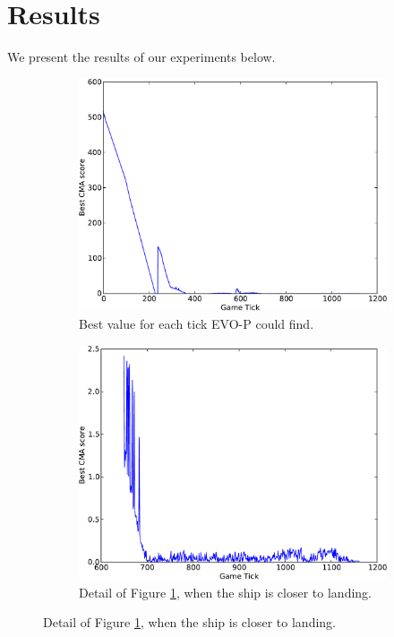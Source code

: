 \documentclass[conference]{IEEEtran}
\begin{document}
\section{Results} \label{sec:Experiments}
We present the results of our experiments below.

\begin{figure}[ht]



  \centering
        \begin{subfigure}{0.49\textwidth}
                \centering
                \includegraphics[width=1.0\textwidth]{./lunarexps/sample-crop.pdf}
                \caption{Best value for each tick EVO-P could find. }
                \label{fig:sample}
        \end{subfigure}  
        \begin{subfigure}{0.49\textwidth}
                \centering
                \includegraphics[width=1.0\textwidth]{./lunarexps/sample-detail-crop.pdf}
                \caption{Detail of Figure \ref{fig:sample}, when the ship is closer to landing.}
                \label{fig:sample-detail}


\end{subfigure}
\end{figure}
\end{document}
